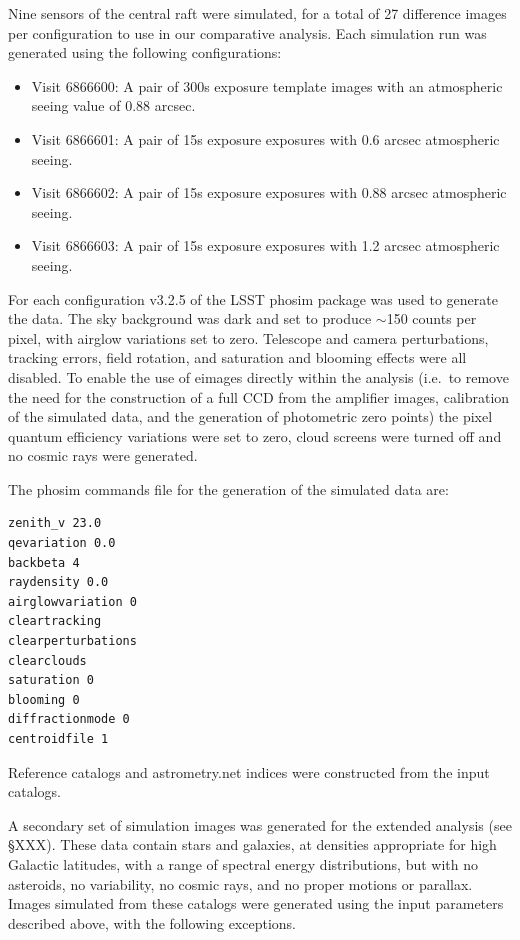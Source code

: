\documentclass[prd, nofootinbib, floatfix, 11pt,tightenlines,times]{article}
\begin{document}
Nine sensors of the central raft were simulated, for a total of 27
difference images per configuration to use in our comparative
analysis.  Each simulation run was generated using the following
configurations:
\begin{itemize}
\item Visit 6866600: A pair of 300s exposure template images with
  an atmospheric seeing value of 0.88 arcsec.
\item Visit 6866601: A pair of 15s exposure exposures with 0.6
 arcsec atmospheric seeing.
\item Visit 6866602: A pair of 15s exposure exposures with 0.88
 arcsec atmospheric seeing.
\item Visit 6866603: A pair of 15s exposure exposures with 1.2
 arcsec atmospheric seeing.
\end{itemize}

For each configuration v3.2.5 of the LSST phosim package was used to
generate the data. The sky background was dark and set to produce
$\sim$150 counts per pixel, with airglow variations set to
zero. Telescope and camera perturbations, tracking errors, field
rotation, and saturation and blooming effects were all disabled. To
enable the use of eimages directly within the analysis (i.e.\ to
remove the need for the construction of a full CCD from the amplifier
images, calibration of the simulated data, and the generation of
photometric zero points) the pixel quantum efficiency variations were
set to zero, cloud screens were turned off and no cosmic rays were
generated.

The phosim commands file for the generation of the simulated data are:
\begin{verbatim}
zenith_v 23.0
qevariation 0.0
backbeta 4
raydensity 0.0
airglowvariation 0
cleartracking
clearperturbations
clearclouds
saturation 0
blooming 0
diffractionmode 0
centroidfile 1
\end{verbatim}


Reference catalogs and astrometry.net indices were constructed from
the input catalogs.

A secondary set of simulation images was generated for the extended
analysis (see \S XXX). These data contain stars and galaxies, at
densities appropriate for high Galactic latitudes, with a range of
spectral energy distributions, but with no asteroids, no variability,
no cosmic rays, and no proper motions or parallax.  Images simulated
from these catalogs were generated using the input parameters
described above, with the following exceptions.
\end{document}
